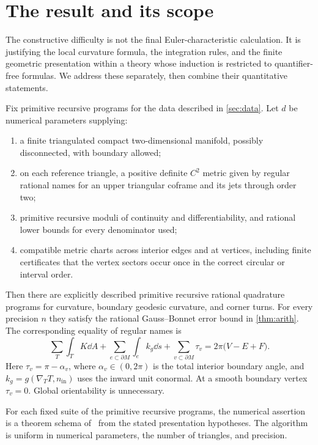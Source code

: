 \section{The result and its scope}\label{sec:result}

The constructive difficulty is not the final Euler-characteristic calculation. It is justifying the local curvature formula, the integration rules, and the finite geometric presentation within a theory whose induction is restricted to quantifier-free formulas. We address these separately, then combine their quantitative statements.

\begin{theorem}\label{thm:main}
Fix primitive recursive programs for the data described in \cref{sec:data}. Let $d$ be numerical parameters supplying:
\begin{enumerate}
\item a finite triangulated compact two-dimensional manifold, possibly disconnected, with boundary allowed;
\item on each reference triangle, a positive definite $C^2$ metric given by regular rational names for an upper triangular coframe and its jets through order two;
\item primitive recursive moduli of continuity and differentiability, and rational lower bounds for every denominator used;
\item compatible metric charts across interior edges and at vertices, including finite certificates that the vertex sectors occur once in the correct circular or interval order.
\end{enumerate}
Then there are explicitly described primitive recursive rational quadrature programs for curvature, boundary geodesic curvature, and corner turns. For every precision $n$ they satisfy the rational Gauss--Bonnet error bound in \cref{thm:arith}. The corresponding equality of regular names is
\begin{equation}\label{eq:main}
\boxed{\quad
\sum_T\int_T K\dd A+
\sum_{e\subset\partial M}\int_e k_g\dd s+
\sum_{v\subset\partial M}\tau_v
=2\pi\bigl(V-E+F\bigr).\quad}
\end{equation}
Here $\tau_v=\pi-\alpha_v$, where $\alpha_v\in(0,2\pi)$ is the total interior boundary angle, and $k_g=g(\nabla_TT,n_{\mathrm{in}})$ uses the inward unit conormal. At a smooth boundary vertex $\tau_v=0$. Global orientability is unnecessary.

For each fixed suite of the primitive recursive programs, the numerical assertion is a theorem schema of \ipra\ from the stated presentation hypotheses. The algorithm is uniform in numerical parameters, the number of triangles, and precision.
\end{theorem}

